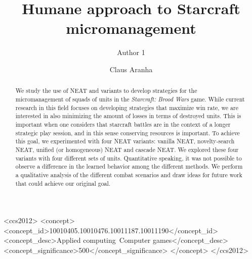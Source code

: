 \documentclass[sigconf, authordraft, anonymous]{acmart}
\begin{document}
\title{Humane approach to Starcraft micromanagement}

\author{Author 1}

\author{Claus Aranha}

\begin{abstract}
  We study the use of NEAT and variants to develop strategies for the
  micromanagement of squads of units in the \emph{Starcraft: Brood
    Wars} game. While current research in this field focuses on
  developing strategies that maximize win rate, we are interested in
  also minimizing the amount of losses in terms of destroyed
  units. This is important when one considers that starcraft battles
  are in the context of a longer strategic play session, and in this
  sense conserving resources is important. To achieve this goal, we
  experimented with four NEAT variants: vanilla NEAT, novelty-search
  NEAT, unified (or homogeneous) NEAT and cascade NEAT. We explored
  these four variants with four different sets of units. Quantitative
  speaking, it was not possible to observe a difference in the learned
  behavior among the different methods. We perform a qualitative
  analysis of the different combat scenarios and draw ideas for future
  work that could achieve our original goal.
\end{abstract}

\begin{CCSXML}
<ccs2012>
<concept>
<concept_id>10010405.10010476.10011187.10011190</concept_id>
<concept_desc>Applied computing~Computer games</concept_desc>
<concept_significance>500</concept_significance>
</concept>
</ccs2012>
\end{CCSXML}



\maketitle
\end{document}
